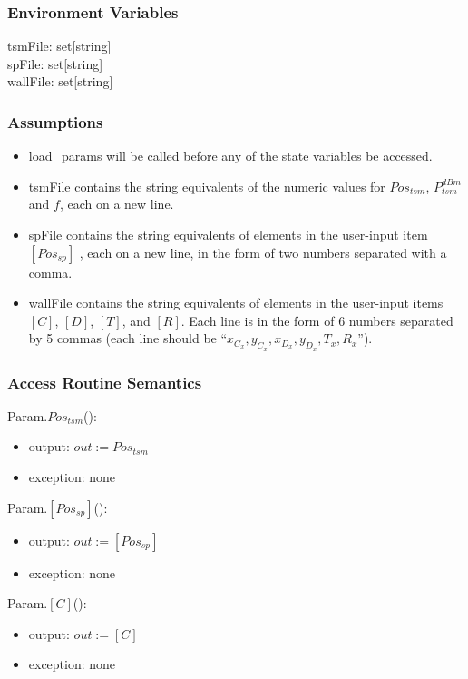 \documentclass[12pt, titlepage]{article}
\begin{document}
\subsubsection{Environment Variables}
tsmFile: set[string]\\
spFile: set[string]\\
wallFile: set[string]\\
\subsubsection{Assumptions}
\begin{itemize}
\item load\_params will be called before any of the state variables be accessed.
\item tsmFile contains the string equivalents of the numeric values for $Pos_{tsm}$, $P_{tsm}^{dBm}$ and $f$, each on a new line.
\item spFile contains the string equivalents of elements in the user-input item $[Pos_{sp}]$ , each on a new line, in the form of two numbers separated with a comma.
\item wallFile contains the string equivalents of elements in the user-input items $[C]$, $[D]$, $[T]$, and $[R]$. Each line is in the form of 6 numbers separated by 5 commas (each line should be “$x_{C_x}, y_{C_x}, x_{D_x}, y_{D_x}, T_x, R_x$”).

\end{itemize}

\subsubsection{Access Routine Semantics}

\noindent Param.$Pos_{tsm}$():
\begin{itemize}
\item output: $out := Pos_{tsm}$
\item exception: none
\end{itemize}

\noindent Param.$[Pos_{sp}]$():
\begin{itemize}
\item output: $out := [Pos_{sp}]$
\item exception: none
\end{itemize}

\noindent Param.$[C]$():
\begin{itemize}
\item output: $out := [C]$
\item exception: none
\end{itemize}
\end{document}
